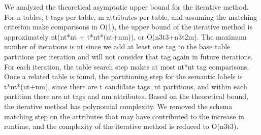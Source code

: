 We analyzed the theoretical asymptotic upper bound for the iterative method. For n tables, t tags per table, m attributes per table, and assuming the matching criterion make comparisons in O(1), the upper bound of the iterative method is approximately nt(nt*nt + t*nt*(nt+nm)), or O(n3t3+n3t2m). The maximum number of iterations is nt since we add at least one tag to the base table partitions per iteration and will not consider that tag again in future iterations. For each iteration, the table search step makes at most nt*nt tag comparisons. Once a related table is found, the partitioning step for the semantic labels is t*nt*(nt+nm), since there are t candidate tags, nt partitions, and within each partition there are nt tags and nm attributes. Based on the theoretical bound, the iterative method has polynomial complexity.
We removed the schema matching step on the attributes that may have contributed to the increase in runtime, and the complexity of the iterative method is reduced to O(n3t3).































